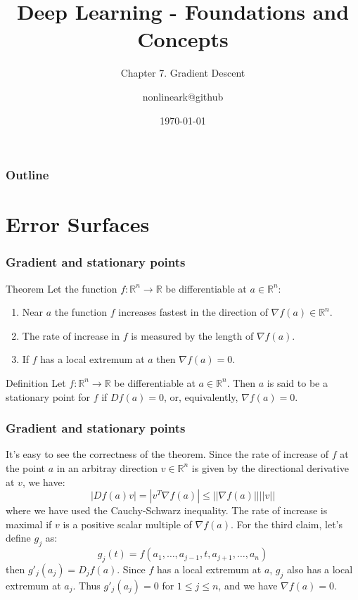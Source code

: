 \documentclass{beamer}
\title{Deep Learning - Foundations and Concepts}
\subtitle{Chapter 7. Gradient Descent}
\author{nonlineark@github}
\date{\today}
\begin{document}
\begin{frame}
    \titlepage
\end{frame}

\begin{frame}
    \frametitle{Outline}
    \tableofcontents
\end{frame}

\section{Error Surfaces}

\begin{frame}
    \frametitle{Gradient and stationary points}
    \begin{block}{Theorem}
        Let the function $f:\mathbb{R}^{n}\to\mathbb{R}$ be differentiable at $a\in\mathbb{R}^{n}$:
        \begin{enumerate}
            \item Near $a$ the function $f$ increases fastest in the direction of $\nabla{}f(a)\in\mathbb{R}^{n}$.
            \item The rate of increase in $f$ is measured by the length of $\nabla{}f(a)$.
            \item If $f$ has a local extremum at $a$ then $\nabla{}f(a)=0$.
        \end{enumerate}
    \end{block}
    \begin{block}{Definition}
        Let $f:\mathbb{R}^{n}\to\mathbb{R}$ be differentiable at $a\in\mathbb{R}^{n}$. Then $a$ is said to be a stationary point for $f$ if $Df(a)=0$, or, equivalently, $\nabla{}f(a)=0$.
    \end{block}
\end{frame}

\begin{frame}
    \frametitle{Gradient and stationary points}
    It's easy to see the correctness of the theorem. Since the rate of increase of $f$ at the point $a$ in an arbitray direction $v\in\mathbb{R}^{n}$ is given by the directional derivative at $v$, we have:
    \begin{equation*}
        |Df(a)v|=|v^{T}\nabla{}f(a)|\le||\nabla{}f(a)||||v||
    \end{equation*}
    where we have used the Cauchy-Schwarz inequality. The rate of increase is maximal if $v$ is a positive scalar multiple of $\nabla{}f(a)$. For the third claim, let's define $g_{j}$ as:
    \begin{equation*}
        g_{j}(t)=f(a_{1},\hdots,a_{j-1},t,a_{j+1},\hdots,a_{n})
    \end{equation*}
    then $g'_{j}(a_{j})=D_{j}f(a)$. Since $f$ has a local extremum at $a$, $g_{j}$ also has a local extremum at $a_{j}$. Thus $g'_{j}(a_{j})=0$ for $1\le{}j\le{}n$, and we have $\nabla{}f(a)=0$.
\end{frame}
\end{document}
